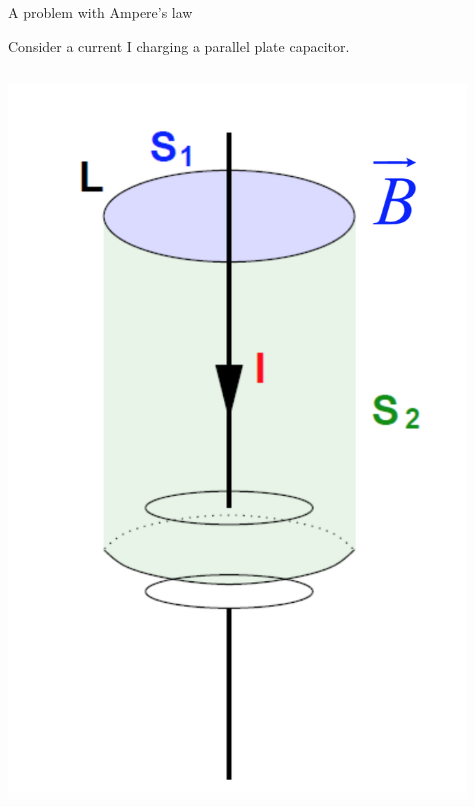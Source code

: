 %
%
%

\begin{frame}{A problem with Ampere's law}

Consider a current I charging a parallel plate capacitor.\\
\vspace{0.3cm}
\begin{columns}
  \begin{column}{0.30\textwidth}
   \begin{center}
    \includegraphics[width=0.95\textwidth]{./images/schematics/problem_with_ampere_law.png}\\
   \end{center}
  \end{column}
  \begin{column}{0.70\textwidth}
  {\small
}
\end{column}
\end{columns}
\end{frame}
